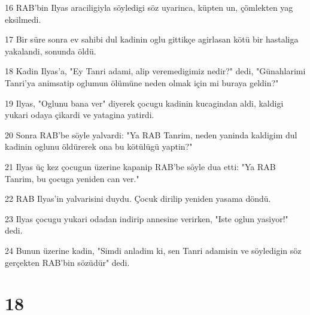 \par 16 RAB'bin Ilyas araciligiyla söyledigi söz uyarinca, küpten un, çömlekten yag eksilmedi.
\par 17 Bir süre sonra ev sahibi dul kadinin oglu gittikçe agirlasan kötü bir hastaliga yakalandi, sonunda öldü.
\par 18 Kadin Ilyas'a, "Ey Tanri adami, alip veremedigimiz nedir?" dedi, "Günahlarimi Tanri'ya animsatip oglumun ölümüne neden olmak için mi buraya geldin?"
\par 19 Ilyas, "Oglunu bana ver" diyerek çocugu kadinin kucagindan aldi, kaldigi yukari odaya çikardi ve yatagina yatirdi.
\par 20 Sonra RAB'be söyle yalvardi: "Ya RAB Tanrim, neden yaninda kaldigim dul kadinin oglunu öldürerek ona bu kötülügü yaptin?"
\par 21 Ilyas üç kez çocugun üzerine kapanip RAB'be söyle dua etti: "Ya RAB Tanrim, bu çocuga yeniden can ver."
\par 22 RAB Ilyas'in yalvarisini duydu. Çocuk dirilip yeniden yasama döndü.
\par 23 Ilyas çocugu yukari odadan indirip annesine verirken, "Iste oglun yasiyor!" dedi.
\par 24 Bunun üzerine kadin, "Simdi anladim ki, sen Tanri adamisin ve söyledigin söz gerçekten RAB'bin sözüdür" dedi.

\chapter{18}


